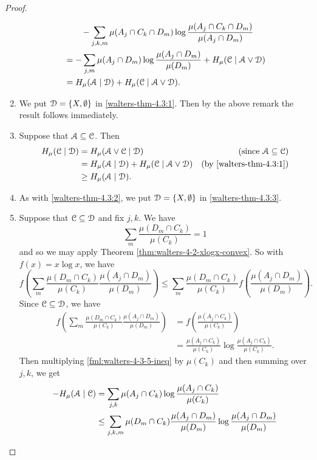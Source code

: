 \begin{theorem}
\begin{proof}
\begin{enumerate}
\begin{align*}
						& \qquad - \sum_{j, k, m}{\mu(A_j \cap C_k \cap D_m) \log{\frac{\mu(A_j \cap C_k \cap D_m)}{\mu(A_j \cap D_m)}}} \\
						&= -\sum_{j, m}{\mu(A_j \cap D_m) \log{\frac{\mu(A_j \cap D_m)}{\mu(D_m)}}} + H_\mu(\mathcal{C} \mid \mathcal{A} \vee \mathcal{D}) \\
						&= H_\mu(\mathcal{A} \mid \mathcal{D}) + H_\mu(\mathcal{C} \mid \mathcal{A} \vee \mathcal{D}).
				\end{align*}
			\item We put $\mathcal{D} = \{X, \emptyset\}$ in \ref{walters-thm-4.3:1}. Then by the above remark the result follows immediately.
			\item Suppose that $\mathcal{A} \subseteq \mathcal{C}$. Then
				\begin{align*}
					H_\mu(\mathcal{C} \mid \mathcal{D}) &= H_\mu(\mathcal{A} \vee \mathcal{C} \mid \mathcal{D}) & \text{(since } \mathcal{A} \subseteq \mathcal{C}) \\
						&= H_\mu(\mathcal{A} \mid \mathcal{D}) + H_\mu(\mathcal{C} \mid \mathcal{A} \vee \mathcal{D}) & \text{(by \ref{walters-thm-4.3:1})} \\
						&\geq H_\mu(\mathcal{A} \mid \mathcal{D}).
				\end{align*}
			\item As with \ref{walters-thm-4.3:2}, we put $\mathcal{D} = \{X, \emptyset\}$ in \ref{walters-thm-4.3:3}.
			\item Suppose that $\mathcal{C} \subseteq \mathcal{D}$ and fix $j, k$. We have
				\[
					\sum_{m}{\frac{\mu(D_m \cap C_k)}{\mu(C_k)}} = 1
				\]
				and so we may apply Theorem \ref{thm:walters-4-2-xlogx-convex}. So with $f(x) = x\log{x}$, we have
				\begin{equation} \label{fml:walters-4-3-5-ineq}
					f\left(\sum_{m}{\frac{\mu(D_m \cap C_k)}{\mu(C_k)} \frac{\mu(A_j \cap D_m)}{\mu(D_m)}}\right) \leq \sum_{m}{\frac{\mu(D_m \cap C_k)}{\mu(C_k)} f\left(\frac{\mu(A_j \cap D_m)}{\mu(D_m)}\right)}.
				\end{equation}
				Since $\mathcal{C} \subseteq \mathcal{D}$, we have
				\begin{align*}
					f\left(\sum_{m}{\frac{\mu(D_m \cap C_k)}{\mu(C_k)} \frac{\mu(A_j \cap D_m)}{\mu(D_m)}}\right) &= f\left(\frac{\mu(A_j \cap C_k)}{\mu(C_k)}\right) \\
						&= \frac{\mu(A_j \cap C_k)}{\mu(C_k)} \log{\frac{\mu(A_j \cap C_k)}{\mu(C_k)}}.
				\end{align*}
				Then multiplying \eqref{fml:walters-4-3-5-ineq} by $\mu(C_k)$ and then summing over $j, k$, we get
				\begin{align*}
					-H_\mu(\A \mid \C) &= \sum_{j, k}{\mu(A_j \cap C_k) \log{\frac{\mu(A_j \cap C_k)}{\mu(C_k)}}} \\
						&\leq \sum_{j, k, m}{\mu(D_m \cap C_k) \frac{\mu(A_j \cap D_m)}{\mu(D_m)} \log{\frac{\mu(A_j \cap D_m)}{\mu(D_m)}}} \\

\end{align*}
\end{enumerate}
\end{proof}
\end{theorem}

